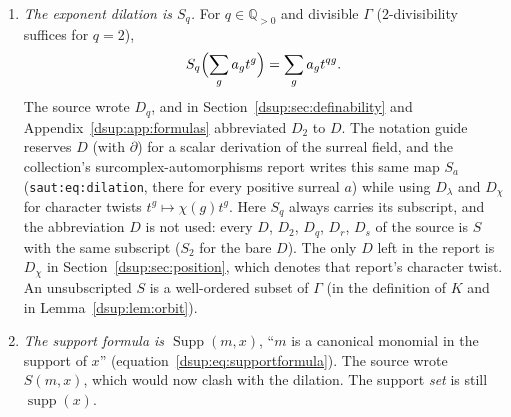 \documentclass[11pt,oneside]{article}
\numberwithin{equation}{section}
\theoremstyle{definition}
\theoremstyle{remark}
\newcommand{\Q}{\mathbb Q}
\newcommand{\supp}{\operatorname{supp}}
\DeclareMathOperator{\Supp}{Supp}
\newcommand{\lbl}[1]{\nolinkurl{#1}}%
\begin{document}
\begin{enumerate}[leftmargin=*,itemsep=3pt]
\item \emph{The exponent dilation is $S_q$.} For $q\in\Q_{>0}$ and divisible
$\Gamma$ ($2$-divisibility suffices for $q=2$),
\[
 S_q\Bigl(\sum_g a_gt^g\Bigr)=\sum_g a_gt^{qg}.
\]
The source wrote $D_q$, and in Section~\ref{dsup:sec:definability} and
Appendix~\ref{dsup:app:formulas} abbreviated $D_2$ to $D$. The notation guide
reserves $D$ (with $\partial$) for a scalar derivation of the surreal field,
and the collection's surcomplex-automorphisms report writes this same map
$S_a$ (\lbl{saut:eq:dilation}, there for every positive surreal $a$) while
using $D_\lambda$ and $D_\chi$ for character twists
$t^g\mapsto\chi(g)t^g$. Here $S_q$ always carries its subscript, and the
abbreviation $D$ is not used: every $D$, $D_2$, $D_q$, $D_r$, $D_s$ of the
source is $S$ with the same subscript ($S_2$ for the bare $D$). The only
$D$ left in the report is $D_\chi$ in Section~\ref{dsup:sec:position}, which
denotes that report's character twist. An unsubscripted $S$ is a well-ordered subset of $\Gamma$ (in the definition
of $K$ and in Lemma~\ref{dsup:lem:orbit}).
\item \emph{The support formula is $\Supp(m,x)$}, ``$m$ is a canonical
monomial in the support of $x$'' (equation~\eqref{dsup:eq:supportformula}).
The source wrote $S(m,x)$, which would now clash with the dilation. The
support \emph{set} is still $\supp(x)$.
\end{enumerate}
\end{document}
